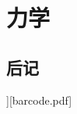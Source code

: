 \documentclass[themecolor=colorful,openany]{textbook-cn}%
\begin{document}
\part{力学}



%

%

%
%
%
%
%
%
%
%
%
%
%
%
%


\backmatter

%	

\chapter{后记}

\lipsum

\makeback[\lipsum[2]][barcode.pdf]

\end{document}
